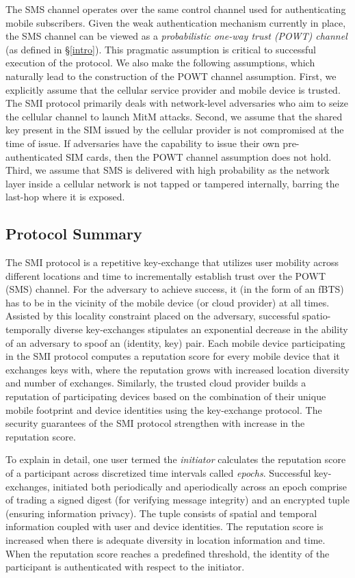 \documentclass[letterpaper,twocolumn]{sig-alternate}
\begin{document}
The SMS channel operates over the same control channel used for authenticating mobile subscribers. Given the weak authentication mechanism currently in place, the SMS channel can be viewed as a {\em probabilistic one-way trust (POWT) channel} (as defined in \S \ref{intro}). This pragmatic assumption is critical to successful execution of the protocol. We also make the following assumptions, which naturally lead to the construction of the POWT channel assumption. First, we explicitly assume that the cellular service provider and mobile device is trusted. The SMI protocol primarily deals with network-level adversaries who aim to seize the cellular channel to launch MitM attacks. Second, we assume that the shared key present in the SIM issued by the cellular provider is not compromised at the time of issue. If adversaries have the capability to issue their own pre-authenticated SIM cards, then the POWT channel assumption does not hold. Third, we assume that SMS is delivered with high probability as the network layer inside a cellular network is not tapped or tampered internally, barring the last-hop where it is exposed. 

\subsection{Protocol Summary}
\label{basic}

The SMI protocol is a repetitive key-exchange that utilizes user mobility across different locations and time to incrementally establish trust over the POWT (SMS) channel. For the adversary to achieve success, it (in the form of an fBTS) has to be in the vicinity of the mobile device (or cloud provider) at all times. Assisted by this locality constraint placed on the adversary, successful spatio-temporally diverse key-exchanges stipulates an exponential decrease in the ability of an adversary to spoof an (identity, key) pair. Each mobile device participating in the SMI protocol computes a reputation score for every mobile device that it exchanges keys with, where the reputation grows with increased location diversity and number of exchanges. Similarly, the trusted cloud provider builds a reputation of participating devices based on the combination of their unique mobile footprint and device identities using the key-exchange protocol. The security guarantees of the SMI protocol strengthen with increase in the reputation score. 

\vspace{1mm}
 To explain in detail, one user termed the {\em initiator} calculates the reputation score of a participant across discretized time intervals called {\em epochs}. Successful key-exchanges, initiated both periodically and aperiodically across an epoch comprise of trading a signed digest (for verifying message integrity) and an encrypted tuple (ensuring information privacy). The tuple consists of spatial and temporal information coupled with user and device identities. The reputation score is increased when there is adequate diversity in location information and time. When the reputation score reaches a predefined threshold, the identity of the participant is authenticated with respect to the initiator. 
\end{document}
